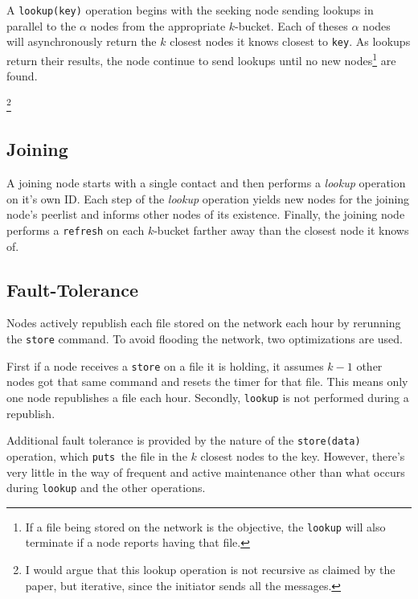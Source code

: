 A \texttt{lookup(key)} operation begins with the seeking node sending lookups in parallel to the $\alpha$ nodes from the appropriate $k$-bucket.
Each of theses $\alpha$ nodes will asynchronously return the $k$ closest nodes it knows closest to \texttt{key}.
As lookups return their results, the node continue to send lookups until no new nodes\footnote{If a file being stored on the network is the objective, the \texttt{lookup} will also terminate if a node reports having that file.} are found.  

\footnote{I would argue that this lookup operation is not recursive as claimed by the paper, but iterative, since the initiator sends all the messages.}

\subsection*{Joining}
A joining node starts with a single contact and then performs a \textit{lookup} operation on it's own ID.
Each step of the \textit{lookup} operation yields new nodes for the joining node's peerlist and informs other nodes of its existence.
Finally, the joining node performs a \texttt{refresh} on each $k$-bucket farther away than the closest node it knows of.




\subsection*{Fault-Tolerance}
Nodes actively republish each file stored on the network each hour by rerunning the \texttt{store} command.  
To avoid flooding the network, two optimizations are used.

First if a node receives a \texttt{store} on a file it is holding, it assumes $k-1$ other nodes got that same command and resets the timer for that file.
This means only one node republishes a file each hour.
Secondly, \texttt{lookup} is not performed during a republish.


Additional fault tolerance is provided by the nature of the \texttt{store(data)} operation, which \texttt{puts }the file in the $k$ closest nodes to the key.
However, there's very little in the way of frequent and active maintenance other than what occurs during \texttt{lookup} and the other operations.












